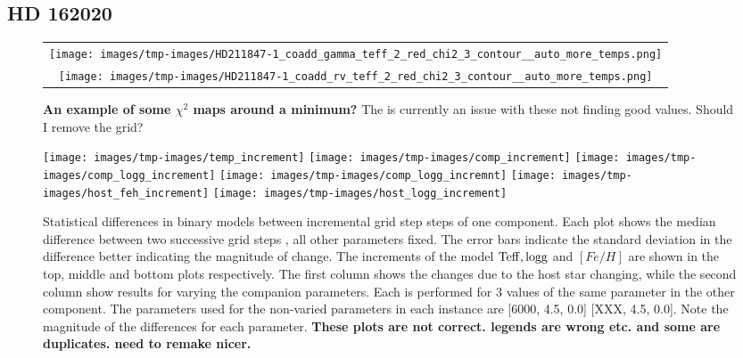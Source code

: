 \subsection{HD 162020}
\label{subsubsec:HD162020}


\begin{figure}
	\begin{tabular}{c}
	    \texttt{[image: images/tmp-images/HD211847-1\_coadd\_gamma\_teff\_2\_red\_chi2\_3\_contour\_\_auto\_more\_temps.png]} \\
	    \texttt{[image: images/tmp-images/HD211847-1\_coadd\_rv\_teff\_2\_red\_chi2\_3\_contour\_\_auto\_more\_temps.png]} \\
	\end{tabular}
	
	\caption{\textbf{An example of some \(\chi^2\) maps around a minimum?} The is currently an issue with these not finding good values. Should I remove the grid?}
\end{figure}

\begin{figure}
	\centering
	\texttt{[image: images/tmp-images/temp\_increment]}
	\texttt{[image: images/tmp-images/comp\_increment]}
	\texttt{[image: images/tmp-images/comp\_logg\_increment]}
	\texttt{[image: images/tmp-images/comp\_logg\_incremnt]}
	\texttt{[image: images/tmp-images/host\_feh\_increment]}
	\texttt{[image: images/tmp-images/host\_logg\_increment]}
	
	\caption{Statistical differences in binary models between incremental grid step steps of one component. Each plot shows the median difference between two successive grid steps , all other parameters fixed. The error bars indicate the standard deviation in the difference better indicating the magnitude of change. The increments of the model \(\rm Teff, logg\) and \([Fe/H]\) are shown in the top, middle and bottom plots respectively. The first column shows the changes due to the host star changing, while the second column show results for varying the companion parameters. Each is performed for 3 values of the same parameter in the other component.
	The parameters used for the non-varied parameters in each instance are [6000, 4.5, 0.0] [XXX, 4.5, 0.0]. Note the magnitude of the differences for each parameter. 
	\textbf{These plots are not correct. legends are wrong etc. and some are duplicates. need to remake nicer.}}
	\label{fig:comp_increment}
\end{figure}



